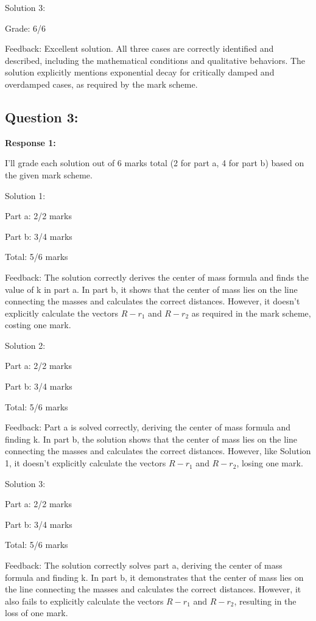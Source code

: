\documentclass[a4paper,11pt]{article}
\begin{document}
Solution 3:

Grade: 6/6

Feedback: Excellent solution. All three cases are correctly identified and described, including the mathematical conditions and qualitative behaviors. The solution explicitly mentions exponential decay for critically damped and overdamped cases, as required by the mark scheme.


\subsection*{Question 3:}

\textbf{Response 1:}

I'll grade each solution out of 6 marks total (2 for part a, 4 for part b) based on the given mark scheme.

Solution 1:

Part a: 2/2 marks

Part b: 3/4 marks

Total: 5/6 marks

Feedback: The solution correctly derives the center of mass formula and finds the value of k in part a. In part b, it shows that the center of mass lies on the line connecting the masses and calculates the correct distances. However, it doesn't explicitly calculate the vectors \(R - r_1\) and \(R - r_2\) as required in the mark scheme, costing one mark.

Solution 2:

Part a: 2/2 marks

Part b: 3/4 marks

Total: 5/6 marks

Feedback: Part a is solved correctly, deriving the center of mass formula and finding k. In part b, the solution shows that the center of mass lies on the line connecting the masses and calculates the correct distances. However, like Solution 1, it doesn't explicitly calculate the vectors \(R - r_1\) and \(R - r_2\), losing one mark.

Solution 3:

Part a: 2/2 marks

Part b: 3/4 marks

Total: 5/6 marks

Feedback: The solution correctly solves part a, deriving the center of mass formula and finding k. In part b, it demonstrates that the center of mass lies on the line connecting the masses and calculates the correct distances. However, it also fails to explicitly calculate the vectors \(R - r_1\) and \(R - r_2\), resulting in the loss of one mark.
\end{document}
